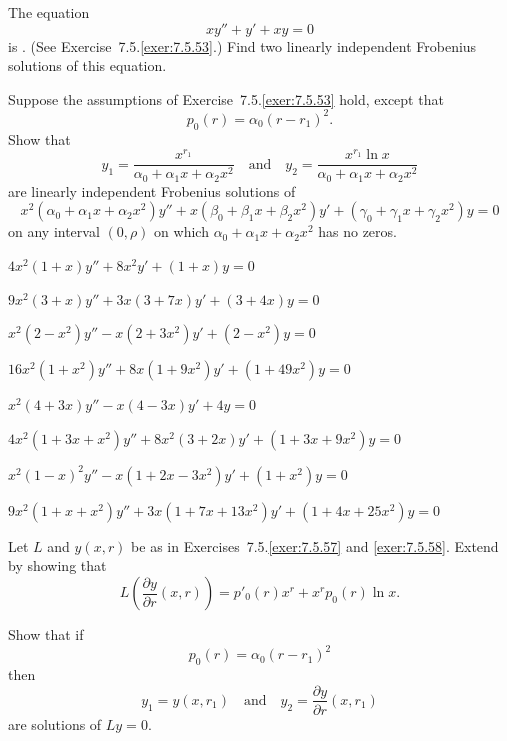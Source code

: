 \begin{exerciselist}
\item\label{exer:7.6.56}The equation
\[
xy''+y'+xy=0
\]
is
. (See
{Exercise~7.5.\ref{exer:7.5.53}}.)
  Find two linearly independent Frobenius solutions of this equation.

\item\label{exer:7.6.57}Suppose the assumptions of {Exercise~7.5.\ref{exer:7.5.53}}
hold, except that
\[
p_0(r)=\alpha_0(r-r_1)^2.
\]
 Show that
\[
y_1=\frac{x^{r_1}}{\alpha_0+\alpha_1x+\alpha_2x^2}\quad\text{and}\quad
y_2=\frac{x^{r_1}\ln x}{\alpha_0+\alpha_1x+\alpha_2x^2}
\]
are linearly independent Frobenius  solutions of
\[
x^2(\alpha_0+\alpha_1x+\alpha_2 x^2)y''+x(\beta_0+\beta_1x+\beta_2x^2)y'+
(\gamma_0+\gamma_1x+\gamma_2x^2)y=0
\]
on any interval $(0,\rho)$ on which
$\alpha_0+\alpha_1x+\alpha_2x^2$ has no zeros.


\item\label{exer:7.6.58}$4x^2(1+x)y''+8x^2y'+(1+x)y=0$

\item\label{exer:7.6.59}$9x^2(3+x)y''+3x(3+7x)y'+(3+4x)y=0$

\item\label{exer:7.6.60}$x^2(2-x^2)y''-x(2+3x^2)y'+(2-x^2)y=0$

\item\label{exer:7.6.61}$16x^2(1+x^2)y''+8x(1+9x^2)y'+(1+49x^2)y=0$

\item\label{exer:7.6.62}$x^2(4+3x)y''-x(4-3x)y'+4y=0$

\item\label{exer:7.6.63}$4x^2(1+3x+x^2)y''+8x^2(3+2x)y'+(1+3x+9x^2)y=0$

\item\label{exer:7.6.64}$x^2(1-x)^2y''-x(1+2x-3x^2)y'+(1+x^2)y=0$

\item\label{exer:7.6.65}$9x^2(1+x+x^2)y''+3x(1+7x+13x^2)y'+(1+4x+25x^2)y=0$

\item\label{exer:7.6.66}\begin{alist}
\item %
Let $L$ and $y(x,r)$ be as in {Exercises~7.5.\ref{exer:7.5.57}} and
\ref{exer:7.5.58}. Extend  by showing that
\[
L\left(\frac{\partial y}{\partial
r}(x,r)\right)=p'_0(r)x^r+x^rp_0(r)\ln x.
\]
\item %
Show that if
\[
p_0(r)=\alpha_0(r-r_1)^2
\]
then
\[
y_1=y(x,r_1) \quad\text{and}\quad  y_2=\frac{\partial
y}{\partial r}(x,r_1)
\]
 are solutions of $Ly=0$.
\end{alist}

\end{exerciselist}


